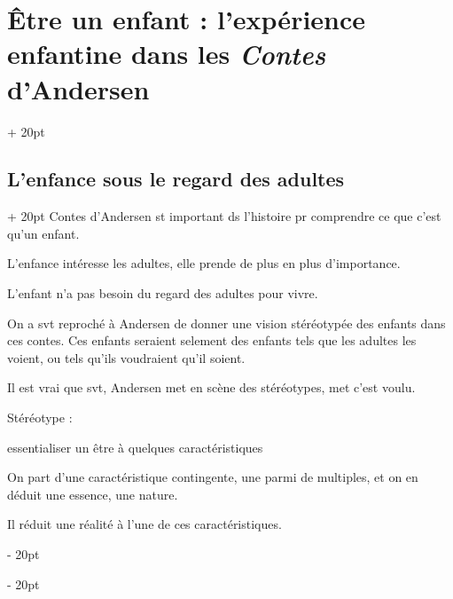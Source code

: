 \documentclass[a4paper, 12pt, twoside]{article}
\newcommand{\ind}[1][20pt]{\advance\leftskip + #1}
\newcommand{\deind}[1][20pt]{\advance\leftskip - #1}
\newenvironment{indt}[2][20pt]{#2 \par \ind[#1]}{\par \deind} %
\begin{document}
    \vspace{12pt}
    
    \begin{indt}{\section{Être un enfant : l'expérience enfantine dans les \textit{Contes} d'Andersen}}
        
        \begin{indt}{\subsection{L'enfance sous le regard des adultes}}
            Contes d'Andersen st important ds l'histoire pr comprendre ce que c'est qu'un enfant.
            
            L'enfance intéresse les adultes, elle prende de plus en plus d'importance.
            
            L'enfant n'a pas besoin du regard des adultes pour vivre.
            
            \vspace{12pt}
            
            On a svt reproché à Andersen de donner une vision stéréotypée des enfants dans ces contes. Ces enfants seraient selement des enfants tels que les adultes les voient, ou tels qu'ils voudraient qu'il soient.
            
            Il est vrai que svt, Andersen met en scène des stéréotypes, met c'est voulu.
            
            
            Stéréotype : %
            
            essentialiser un être à quelques caractéristiques
            
            On part d'une caractéristique contingente, une parmi de multiples, et on en déduit une essence, une nature.
            
            Il réduit une réalité à l'une de ces caractéristiques.
        \end{indt}
        
    \end{indt}
    
    
    
\end{document}

